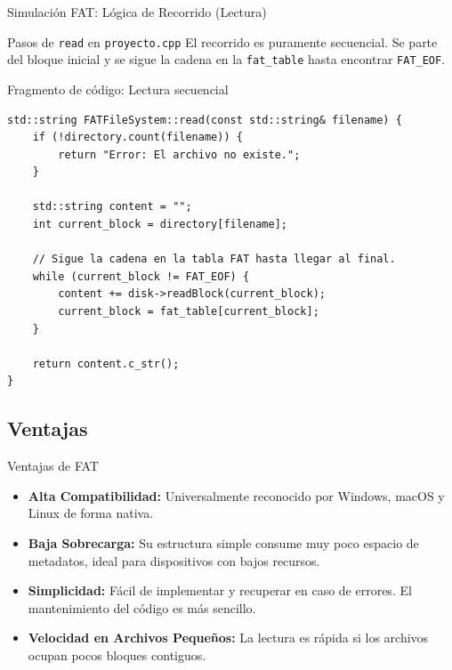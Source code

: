 \documentclass{beamer}
\begin{document}
\begin{frame}[fragile]{Simulación FAT: Lógica de Recorrido (Lectura)}
    \begin{block}{Pasos de \texttt{read} en \texttt{proyecto.cpp}}
        El recorrido es puramente secuencial. Se parte del bloque inicial y se sigue la cadena en la \texttt{fat\_table} hasta encontrar \texttt{FAT\_EOF}.
    \end{block}
    
    \begin{exampleblock}{Fragmento de código: Lectura secuencial}
        \begin{lstlisting}
std::string FATFileSystem::read(const std::string& filename) {
    if (!directory.count(filename)) {
        return "Error: El archivo no existe.";
    }

    std::string content = "";
    int current_block = directory[filename];

    // Sigue la cadena en la tabla FAT hasta llegar al final.
    while (current_block != FAT_EOF) {
        content += disk->readBlock(current_block);
        current_block = fat_table[current_block];
    }
    
    return content.c_str(); 
}
        \end{lstlisting}
    \end{exampleblock}
\end{frame}


\subsection{Ventajas}
\begin{frame}{Ventajas de FAT}
    \begin{itemize}
        \item \textbf{Alta Compatibilidad:} Universalmente reconocido por Windows, macOS y Linux de forma nativa.
        \vspace{0.5cm}
        \item \textbf{Baja Sobrecarga:} Su estructura simple consume muy poco espacio de metadatos, ideal para dispositivos con bajos recursos.
        \vspace{0.5cm}
        \item \textbf{Simplicidad:} Fácil de implementar y recuperar en caso de errores. El mantenimiento del código es más sencillo.
        \vspace{0.5cm}
        \item \textbf{Velocidad en Archivos Pequeños:} La lectura es rápida si los archivos ocupan pocos bloques contiguos.
    \end{itemize}
\end{frame}
\end{document}
